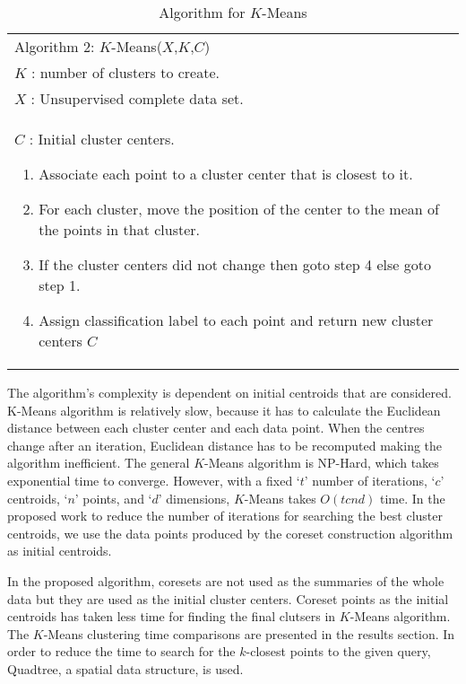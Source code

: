 \documentclass[runningheads]{llncs}
\begin{document}
\begin{table}[!hbt]
	\caption{Algorithm for $K$-Means}
	\label{tab:2}   
	\begin{tabular}{p{11cm}}
		\hline\noalign{\smallskip}
		Algorithm 2: $K$-Means($X$,$K$,$C$)\\
		\noalign{\smallskip}\hline
		$K$ : number of clusters to create.\\
		$X$ : Unsupervised complete data set.\\
		$C$ : Initial cluster centers.
		\begin{enumerate}
			\item{Associate each point to a cluster center that is closest to it.}
			\item{For each cluster, move the position of the center to the mean of the points in that cluster.}
			\item{If the cluster centers did not change then goto step 4 else goto step 1.}
			\item{Assign classification label to each point and return new cluster centers $C$}
		\end{enumerate} \\ \hline
		
	\end{tabular}
\end{table}
The algorithm’s complexity is dependent on initial centroids that are considered. K-Means algorithm is relatively slow, because it has to calculate the Euclidean distance between each cluster center and each data point. When the centres change after an iteration, Euclidean distance has to be recomputed making the algorithm inefficient. The general $K$-Means algorithm is NP-Hard\cite{Meena Mahajana}, which takes exponential time to converge. However, with a fixed `$t$' number of iterations, `$c$' centroids, `$n$' points, and `$d$' dimensions, $K$-Means takes $O(tcnd)$ time. In the proposed work  to reduce the number of iterations for searching the best cluster centroids, we use the data points produced by the coreset construction algorithm  as initial centroids. 

In the proposed algorithm, coresets are not used as the summaries of the whole data but they are used as the initial cluster centers. Coreset points as the initial centroids has taken less time for finding the final clutsers in $K$-Means algorithm. The $K$-Means clustering time comparisons are presented in the results section.
In order to reduce the time to search for the $k$-closest points to the given query, Quadtree, a spatial data structure, is used.
\end{document}
